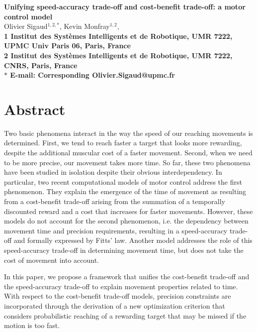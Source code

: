 \documentclass[10pt]{article}
\date{}
\begin{document}
\begin{flushleft}
{\Large
\textbf{Unifying speed-accuracy trade-off and cost-benefit trade-off: a motor control model}
}
\\
Olivier Sigaud$^{1,2,\ast}$, 
Kevin Monfray$^{1,2}$, 
\\
\bf{1} Institut des Syst\`emes Intelligents et de Robotique, UMR 7222, UPMC Univ Paris 06, Paris, France
\\
\bf{2} Institut des Syst\`emes Intelligents et de Robotique, UMR 7222, CNRS, Paris, France
\\
$\ast$ E-mail: Corresponding Olivier.Sigaud@upmc.fr
\end{flushleft}

\section*{Abstract}
Two basic phenomena interact in the way the speed of our reaching movements is determined.
First, we tend to reach faster a target that looks more rewarding, despite the additional muscular cost
of a faster movement.
Second, when we need to be more precise, our movement takes more time.
So far, these two phenomena have been studied in isolation despite their obvious interdependency.
In particular, two recent computational models of motor control address the first phenomenon. They explain the emergence of the time of movement as resulting from a cost-benefit trade-off arising from the summation of a temporally discounted reward and a cost that increases for faster movements.
However, these models do not account for the second phenomenon, i.e. the dependency between movement time and precision requirements, resulting in a speed-accuracy trade-off and formally expressed by Fitts' law. Another model addresses the role of this speed-accuracy trade-off in determining movement time, but does not take the cost of movement into account.

In this paper, we propose a framework that unifies the cost-benefit trade-off and the speed-accuracy trade-off to explain movement properties related to time.
With respect to the cost-benefit trade-off models, precision constraints are incorporated through the derivation of a new optimization criterion that considers probabilistic reaching of a rewarding target that may be missed if the motion is too fast.
\end{document}
